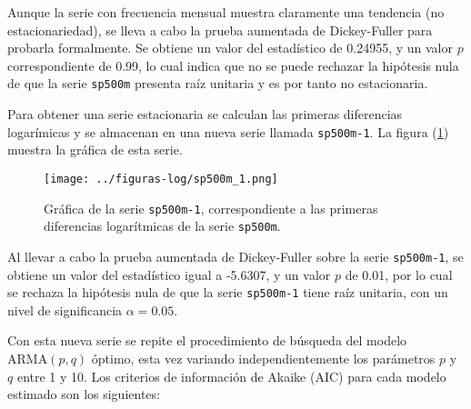 \documentclass{article}
\begin{document}
Aunque la serie con frecuencia mensual muestra claramente una tendencia (no estacionariedad), se lleva a cabo la prueba aumentada de Dickey-Fuller para probarla formalmente. Se obtiene un valor del estadístico de 0.24955, y un valor $p$ correspondiente de 0.99, lo cual indica que no se puede rechazar la hipótesis nula de que la serie \texttt{sp500m} presenta raíz unitaria y es por tanto no estacionaria.

Para obtener una serie estacionaria se calculan las primeras diferencias logarímicas y se almacenan en una nueva serie llamada \texttt{sp500m-1}. La figura (\ref{fig:sp500m-1}) muestra la gráfica de esta serie.

\begin{figure}[H]
\centering
\texttt{[image: ../figuras-log/sp500m\_1.png]}
\caption{\label{fig:sp500m-1}Gráfica de la serie \texttt{sp500m-1}, correspondiente a las primeras diferencias logarítmicas de la serie \texttt{sp500m}.}
\end{figure}

Al llevar a cabo la prueba aumentada de Dickey-Fuller sobre la serie \texttt{sp500m-1}, se obtiene un valor del estadístico igual a -5.6307, y un valor $p$ de 0.01, por lo cual se rechaza la hipótesis nula de que la serie \texttt{sp500m-1} tiene raíz unitaria, con un nivel de significancia $\alpha=0.05$.

Con esta nueva serie se repite  el procedimiento de búsqueda del modelo $\mathrm{ARMA}(p, q)$ óptimo, esta vez variando independientemente los parámetros $p$ y $q$ entre 1 y 10. Los criterios de información de Akaike (AIC) para cada modelo estimado son los siguientes:
\end{document}
